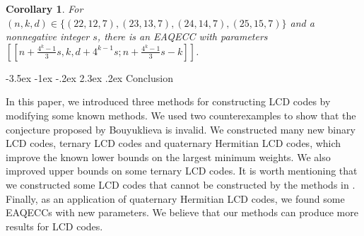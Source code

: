 \documentclass[12pt,twoside]{article}
\makeatletter
\renewcommand\section{\@startsection {section}{1}{\z@}%
                                   {-3.5ex \@plus -1ex \@minus -.2ex}%
                                   {2.3ex \@plus.2ex}%
                                   {\normalfont\large\bfseries}}
\theoremstyle{plain}
\newtheorem{cor}[theorem]{Corollary}
\theoremstyle{definition}
\theoremstyle{remark}
\makeatother
\begin{document}
\begin{cor}
For $(n,k,d)\in \{(22,12,7),(23,13,7),(24,14,7),(25,15,7)\}$ and a nonnegative integer $s$,
there is an EAQECC with parameters $[[n+\frac{4^k-1}{3}s,k,d+4^{k-1}s;n+\frac{4^k-1}{3}s-k]]$.
\end{cor}





\section{Conclusion}

In this paper, we introduced three methods for constructing LCD codes by modifying some known methods.
We used two counterexamples to show that the conjecture proposed by Bouyuklieva is invalid.
We constructed many new binary LCD codes, ternary LCD codes and quaternary Hermitian LCD codes, which improve the known lower bounds on the largest minimum weights. We also improved upper bounds on some ternary LCD codes.
It is worth mentioning that we constructed some LCD codes that cannot be constructed by the methods in \cite{234-lcD}.
Finally, as an application of quaternary Hermitian LCD codes, we found some EAQECCs with new parameters. We believe that our methods can produce more results for LCD codes.
\end{document}
